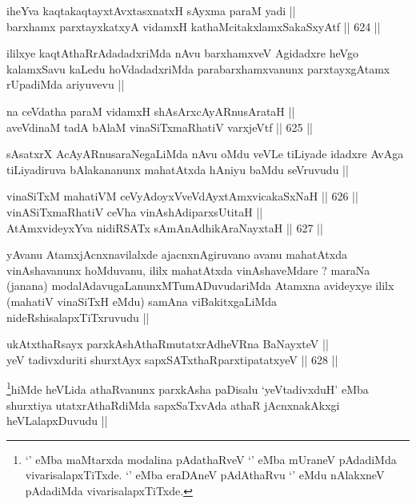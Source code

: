 
\begin{shl}
iheYva kaqtakaqtayxtAvxtasxnatxH sAyxma paraM yadi || \\
barxhamx parxtayxkatxyA vidamxH kathaMcitakxlamxSakaSxyAtf ||  624 ||  
\end{shl}

\begin{artha}
ililxye kaqtAthaRrAdadadxriMda nAvu barxhamxveV Agidadxre heVgo
kalamxSavu kaLedu hoVdadadxriMda parabarxhamxvanunx parxtayxgAtamx
rUpadiMda ariyuvevu ||
\end{artha}

\begin{shl}
na ceVdatha paraM vidamxH shAsArxcAyARnusArataH || \\
aveVdinaM tadA bAlaM vinaSiTxmaRhatiV varxjeVtf ||  625 ||  
\end{shl}

\begin{artha}
sAsatxrX AcAyARnusaraNegaLiMda nAvu oMdu veVLe tiLiyade idadxre AvAga
tiLiyadiruva bAlakananunx mahatAtxda hAniyu baMdu seVruvudu ||
\end{artha}

\begin{shl}
vinaSiTxM mahatiVM ceVyAdoyxV\s veVdAyxtAmx\s vicakaSxNaH ||  626 ||  \\
vinASiTxmaRhatiV ceVha vinAshAdiparxsUtitaH ||  \\
AtAmxvideyxYva nidiRSATx sAmAnAdhikAraNayxtaH ||  627 ||  
\end{shl}

\begin{artha}
yAvanu AtamxjAcnxnavilalxde ajacnxnAgiruvano avanu mahatAtxda
vinAshavanunx hoMduvanu, ililx mahatAtxda vinAshaveMdare ? maraNa
(janana) modalAdavugaLanunxMTumADuvudariMda Atamxna avideyxye ililx
(mahatiV vinaSiTxH eMdu) samAna viBakitxgaLiMda
nideRshisalapxTiTxruvudu ||
\end{artha}

\begin{shl}
ukAtxthaRsayx parxkAshAthaRmutatxrAdheVRna BaNayxteV || \\
yeV tadivxduriti shurxtAyx sapxSATxthaRparxtipatatxyeV ||  628 ||  
\end{shl}

\begin{artha}
\footnote{`\stext' eMba maMtarxda modalina pAdathaRveV `\stext' eMba
  mUraneV pAdadiMda vivarisalapxTiTxde. `\stext' eMba eraDAneV
  pAdAthaRvu `\stext' eMdu nAlakxneV pAdadiMda vivarisalapxTiTxde.}hiMde heVLida athaRvanunx parxkAsha paDisalu `yeVtadivxduH'
eMba shurxtiya utatxrAthaRdiMda sapxSaTxvAda athaR jAcnxnakAkxgi
heVLalapxDuvudu ||
\end{artha}


